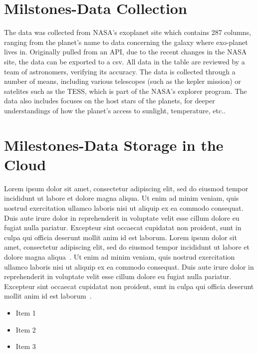 \documentclass[letterpaper, 10 pt, conference]{ieeeconf}  %
\begin{document}
\section{Milstones-Data Collection}

The data was collected from NASA's exoplanet site which contains 287 columns, ranging from the planet's name to data concerning the galaxy where exo-planet lives in. Originally pulled from an API, due to the recent changes in the NASA site, the data can be exported to a csv. All data in the table are reviewed by a team of astronomers, verifying its accuracy. The data is collected through a number of means, including various telescopes (such as the kepler mission) or satelites such as the TESS, which is part of the NASA's explorer program. The data also includes focuses on the host stars of the planets, for deeper understandings of how the planet's access to sunlight, temperature, etc.\cite{nasaExoplanetArchive}. 

\section{Milestones-Data Storage in the Cloud}

Lorem ipsum dolor sit amet, consectetur adipiscing elit, sed do eiusmod tempor incididunt ut labore et dolore magna aliqua. Ut enim ad minim veniam, quis nostrud exercitation ullamco laboris nisi ut aliquip ex ea commodo consequat. Duis aute irure dolor in reprehenderit in voluptate velit esse cillum dolore eu fugiat nulla pariatur. Excepteur sint occaecat cupidatat non proident, sunt in culpa qui officia deserunt mollit anim id est laborum. Lorem ipsum dolor sit amet, consectetur adipiscing elit, sed do eiusmod tempor incididunt ut labore et dolore magna aliqua~\cite{Cite7}. Ut enim ad minim veniam, quis nostrud exercitation ullamco laboris nisi ut aliquip ex ea commodo consequat. Duis aute irure dolor in reprehenderit in voluptate velit esse cillum dolore eu fugiat nulla pariatur. Excepteur sint occaecat cupidatat non proident, sunt in culpa qui officia deserunt mollit anim id est laborum~\cite{Cite8}.

\begin{itemize}
	\item Item 1
	\item Item 2
	\item Item 3
\end{itemize}
\end{document}
